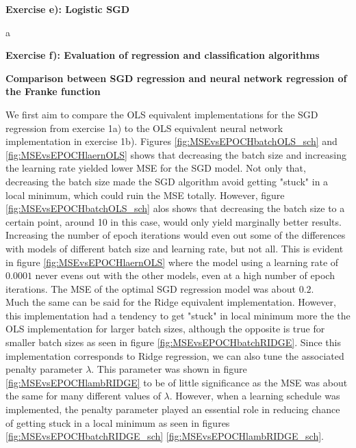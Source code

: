 \documentclass[12pt,a4paper]{article}
\begin{document}
\begin{center}
\Large{\textbf{Exercise e): Logistic SGD}}
\end{center}

\noindent a

\begin{center}
\Large{\textbf{Exercise f): Evaluation of regression and classification algorithms}}
\end{center}

\begin{center}
\large{\textbf{Comparison between SGD regression and neural network regression of the Franke function}}
\end{center}

\noindent We first aim to compare the OLS equivalent implementations for the SGD regression from exercise 1a) to the OLS equivalent neural network implementation in exercise 1b). Figures \ref{fig:MSEvsEPOCHbatchOLS_sch} and \ref{fig:MSEvsEPOCHlaernOLS} shows that decreasing the batch size and increasing the learning rate yielded lower MSE for the SGD model. Not only that, decreasing the batch size made the SGD algorithm avoid getting "stuck" in a local minimum, which could ruin the MSE totally. However, figure \ref{fig:MSEvsEPOCHbatchOLS_sch} alos shows that decreasing the batch size to a certain point, around 10 in this case, would only yield marginally better results. Increasing the number of epoch iterations would even out some of the differences with models of different batch size and learning rate, but not all. This is evident in figure \ref{fig:MSEvsEPOCHlaernOLS} where the model using a learning rate of $0.0001$ never evens out with the other models, even at a high number of epoch iterations. The MSE of the optimal SGD regression model was about $0.2$.
\\
Much the same can be said for the Ridge equivalent implementation. However, this implementation had a tendency to get "stuck" in local minimum more the the OLS implementation for larger batch sizes, although the opposite is true for smaller batch sizes as seen in figure \ref{fig:MSEvsEPOCHbatchRIDGE}. Since this implementation corresponds to Ridge regression, we can also tune the associated penalty parameter $\lambda$. This parameter was shown in figure \ref{fig:MSEvsEPOCHlambRIDGE} to be of little significance as the MSE was about the same for many different values of $\lambda$. However, when a learning schedule was implemented, the penalty parameter played an essential role in reducing chance of getting stuck in a local minimum as seen in figures \ref{fig:MSEvsEPOCHbatchRIDGE_sch} \ref{fig:MSEvsEPOCHlambRIDGE_sch}. 
\end{document}
